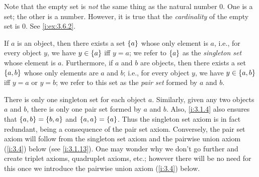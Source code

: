 \begin{rmk}\label{i:3.1.8}
  Note that the empty set is \emph{not} the same thing as the natural number \(0\).
  One is a set;
  the other is a number.
  However, it is true that the \emph{cardinality} of the empty set is \(0\).
  See \cref{i:ex:3.6.2}.
\end{rmk}

\begin{ax}\label{i:3.3}
  If \(a\) is an object, then there exists a set \(\left\lbrace a\right\rbrace\) whose only element is \(a\), i.e., for every object \(y\), we have \(y \in \left\lbrace a\right\rbrace\) iff \(y = a\);
  we refer to \(\left\lbrace a\right\rbrace\) as the \emph{singleton set} whose element is \(a\).
  Furthermore, if \(a\) and \(b\) are objects, then there exists a set \(\left\lbrace a, b\right\rbrace\) whose only elements are \(a\) and \(b\);
  i.e., for every object \(y\), we have \(y \in \left\lbrace a, b\right\rbrace\) iff \(y = a\) or \(y = b\);
  we refer to this set as the \emph{pair set} formed by \(a\) and \(b\).
\end{ax}

\begin{rmk}\label{i:3.1.9}
  There is only one singleton set for each object \(a\).
  Similarly, given any two objects \(a\) and \(b\), there is only one pair set formed by \(a\) and \(b\).
  Also, \cref{i:3.1.4} also ensures that \(\left\lbrace a, b\right\rbrace = \left\lbrace b, a\right\rbrace\) and \(\left\lbrace a, a\right\rbrace = \left\lbrace a\right\rbrace\).
  Thus the singleton set axiom is in fact redundant, being a consequence of the pair set axiom.
  Conversely, the pair set axiom will follow from the singleton set axiom and the pairwise union axiom (\cref{i:3.4}) below (see \cref{i:3.1.13}).
  One may wonder why we don't go further and create triplet axioms, quadruplet axioms, etc.;
  however there will be no need for this once we introduce the pairwise union axiom (\cref{i:3.4}) below.
\end{rmk}

